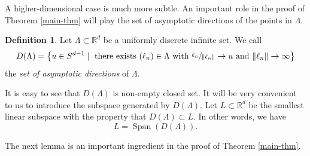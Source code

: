 \documentclass[JEP,XML,SOM,Unicode,NoEqCountersInSection]{cedram}
\DeclareMathOperator{\Span}{Span}
\let\ra\rightarrow
\newcommand{\bR}{\mathbb{R}}
\newcounter{dummy} \numberwithin{dummy}{section}
\theoremstyle{plain}
\theoremstyle{definition}
\newtheorem{mydef}[dummy]{Definition}
\begin{document}
A higher-dimensional case is much more subtle.
An important role in the proof of Theorem \ref{main-thm} will play the set of asymptotic directions of the points in $\Lambda$.
\begin{mydef}
Let $\Lambda \subset \bR^d$ be a uniformly discrete infinite set. We call
\[
D(\Lambda) = \bigl\{ u \in S^{d-1} \mid \text{ there exists } (\ell_n) \in \Lambda \text{ with } \sfrac{\ell_n}{\| \ell_n \|} \ra u \text{ and } \Vert \ell_n \Vert \ra \infty\bigr\}
\]
the \textit{set of asymptotic directions} of $\Lambda$.
\end{mydef}

It is easy to see that $D(\Lambda)$ is non-empty closed set. It will be very convenient to us to introduce the subspace generated by $D(\Lambda)$. Let $L \subset \bR^d$ be the smallest linear subspace with the property that $D(\Lambda) \subset L$. In other words, we have
\[
L = \Span(D(\Lambda)).
\]

The next lemma is an important ingredient in the proof of Theorem \ref{main-thm}.
\end{document}
